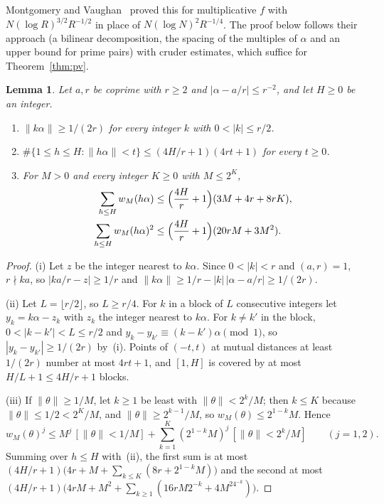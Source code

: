 \documentclass[12pt]{amsart}
\newtheorem{lemma}[theorem]{Lemma}
\theoremstyle{remark}
\begin{document}
Montgomery and Vaughan~\cite[Corollary~1]{MV77} proved this for multiplicative $f$ with
$N(\log R)^{3/2}R^{-1/2}$ in place of $N(\log N)^2R^{-1/4}$. The proof below follows their
approach (a bilinear decomposition, the spacing of the multiples of $\alpha$ and an upper bound
for prime pairs) with cruder estimates, which suffice for Theorem~\ref{thm:pv}.

\begin{lemma}\label{lem:spacing}
Let $a,r$ be coprime with $r\ge2$ and $|\alpha-a/r|\le r^{-2}$, and let $H\ge0$ be an integer.
\begin{enumerate}
\item[(i)] $\|k\alpha\|\ge1/(2r)$ for every integer $k$ with $0<|k|\le r/2$.
\item[(ii)] $\#\{1\le h\le H:\|h\alpha\|<t\}\le(4H/r+1)(4rt+1)$ for every $t\ge0$.
\item[(iii)] For $M>0$ and every integer $K\ge0$ with $M\le2^K$,
\begin{align*}
  \sum_{h\le H}w_M(h\alpha)&\le\Bigl(\frac{4H}r+1\Bigr)(3M+4r+8rK),\\
  \sum_{h\le H}w_M(h\alpha)^2&\le\Bigl(\frac{4H}r+1\Bigr)(20rM+3M^2).
\end{align*}
\end{enumerate}
\end{lemma}

\begin{proof}
(i) Let $z$ be the integer nearest to $k\alpha$. Since $0<|k|<r$ and $(a,r)=1$, $r\nmid ka$, so
$|ka/r-z|\ge1/r$ and $\|k\alpha\|\ge1/r-|k|\,|\alpha-a/r|\ge1/(2r)$.

(ii) Let $L=\lfloor r/2\rfloor$, so $L\ge r/4$. For $k$ in a block of $L$ consecutive integers let
$y_k=k\alpha-z_k$ with $z_k$ the integer nearest to $k\alpha$. For $k\ne k'$ in the block,
$0<|k-k'|<L\le r/2$ and $y_k-y_{k'}\equiv(k-k')\alpha\pmod1$, so $|y_k-y_{k'}|\ge1/(2r)$ by~(i).
Points of $(-t,t)$ at mutual distances at least $1/(2r)$ number at most $4rt+1$, and $[1,H]$ is
covered by at most $H/L+1\le4H/r+1$ blocks.

(iii) If $\|\theta\|\ge1/M$, let $k\ge1$ be least with $\|\theta\|<2^k/M$; then $k\le K$ because
$\|\theta\|\le1/2<2^K/M$, and $\|\theta\|\ge2^{k-1}/M$, so $w_M(\theta)\le2^{1-k}M$. Hence
\[
  w_M(\theta)^j\le M^j\,[\|\theta\|<1/M]+\sum_{k=1}^K(2^{1-k}M)^j\,[\|\theta\|<2^k/M]\qquad(j=1,2).
\]
Summing over $h\le H$ with~(ii), the first sum is at most
$(4H/r+1)\bigl(4r+M+\sum_{k\le K}(8r+2^{1-k}M)\bigr)$ and the second at most
$(4H/r+1)\bigl(4rM+M^2+\sum_{k\ge1}(16rM2^{-k}+4M^24^{-k})\bigr)$.
\end{proof}
\end{document}

